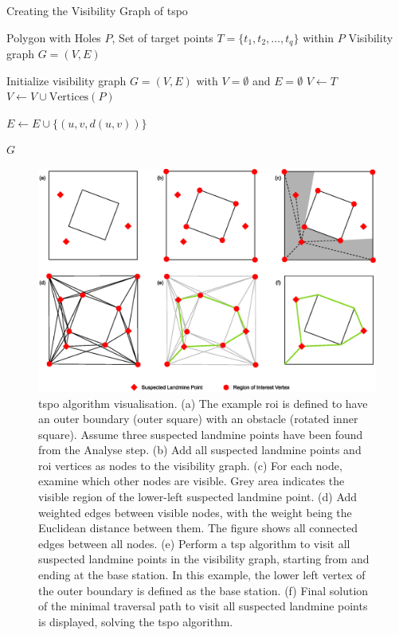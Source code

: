 \begin{algorithm}[h!]
\caption{Creating the Visibility Graph of \gls{tspo}}
\label{alg:msp_tspo2visgraph}
\begin{algorithmic}[1]
\Require Polygon with Holes $P$, Set of target points $T = \{t_1, t_2, \ldots, t_q\}$ within $P$
\Ensure Visibility graph $G = (V, E)$

\State Initialize visibility graph $G = (V, E)$ with $V = \emptyset$ and $E = \emptyset$
\State $V \leftarrow T$ 
\State $V \leftarrow V \cup \text{Vertices}(P)$ 

            \State $E \leftarrow E \cup \{(u, v, d(u, v))\}$ 
        \EndIf
    \EndFor
\EndFor

\Return $G$ 
\end{algorithmic}
\end{algorithm}

\begin{figure}[h!]
    \centering
    \includegraphics[width=\linewidth]{figs/Jihwan/TSPO Algorithm Visualisation.eps}
    \caption[TSP-O Algorithm Visualisation]
    {\gls{tspo} algorithm visualisation. (a) The example \gls{roi} is defined to have an outer boundary (outer square) with an obstacle (rotated inner square). Assume three suspected landmine points have been found from the Analyse step. (b) Add all suspected landmine points and \gls{roi} vertices as nodes to the visibility graph. (c) For each node, examine which other nodes are visible. Grey area indicates the visible region of the lower-left suspected landmine point. (d) Add weighted edges between visible nodes, with the weight being the Euclidean distance between them. The figure shows all connected edges between all nodes. (e) Perform a \gls{tsp} algorithm to visit all suspected landmine points in the visibility graph, starting from and ending at the base station. In this example, the lower left vertex of the outer boundary is defined as the base station. (f) Final solution of the minimal traversal path to visit all suspected landmine points is displayed, solving the \gls{tspo} algorithm. 
    }
    \label{fig:msp_tspo}
\end{figure}

